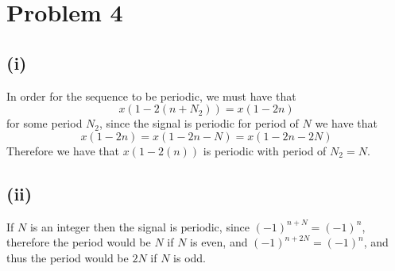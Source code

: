  \section*{Problem 4}
 \subsection*{(i)}
 In order for the sequence to be periodic, we must have that
 $$x(1-2(n+N_2)) = x(1-2n)$$
 for some period $N_2$, since the signal is periodic for period of 
 $N$ we have that
 $$x(1-2n)=x(1-2n-N)=x(1-2n-2N)$$
 Therefore we have that $x(1-2(n))$ is periodic with period of $N_2=N$.
\subsection*{(ii)}
If $N$ is an integer then the signal is $\boxed{\text{periodic}}$, since $(-1)^{n+N}=(-1)^{n}$, therefore
the period would be $\boxed{N}$
if $N$ is even, and $(-1)^{n+2N}=(-1)^{n}$, and thus the period would be $\boxed{2N}$ if $N$ is odd.

